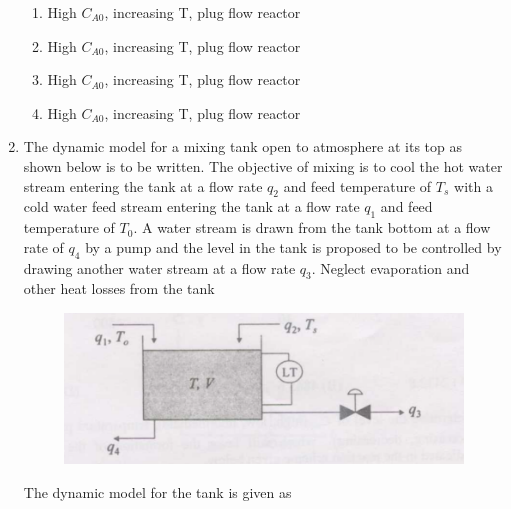 \documentclass[journal,12pt,onecolumn]{IEEEtran}
\theoremstyle{remark}
\begin{document}
\begin{enumerate}
\begin{enumerate}
    \item High $C_{A0}$, increasing T, plug flow reactor
      \item High $C_{A0}$, increasing T, plug flow reactor
        \item High $C_{A0}$, increasing T, plug flow reactor
          \item High $C_{A0}$, increasing T, plug flow reactor
\end{enumerate}
\newpage
    \item The dynamic model for a mixing tank open to atmosphere at its top as shown below is to be written. The objective of mixing is to cool the hot water stream entering the tank at a flow rate $q_2$ and feed temperature of $T_s$ with a cold water feed stream entering the tank at a flow rate $q_1$ and feed temperature of $T_0$. A water stream is drawn from the tank bottom at a flow rate of $q_4$ by a pump and the level in the tank is proposed to be controlled by drawing another water stream at a flow rate $q_3$. Neglect evaporation and other heat losses from the tank
\begin{figure}[H]
    \centering
    \includegraphics[width=0.5\columnwidth]{figs/60.png}
    \caption{}
    \label{fig:60}
\end{figure}

    The dynamic model for the tank is given as


\end{enumerate}
\end{document}
